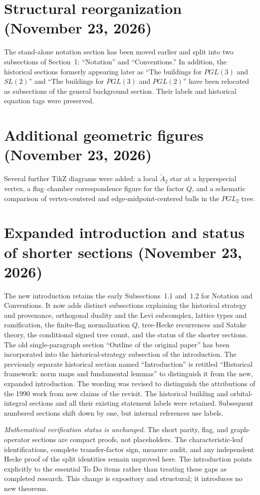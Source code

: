 \documentclass[12pt,letterpaper]{amsart}
\begin{document}
\section*{Structural reorganization (November 23, 2026)}
The stand-alone notation section has been moved earlier and split into two subsections of Section~1: ``Notation'' and ``Conventions.'' In addition, the historical sections formerly appearing later as ``The buildings for $PGL(3)$ and $SL(2)$'' and ``The buildings for $PGL(3)$ and $PGL(2)$'' have been relocated as subsections of the general background section. Their labels and historical equation tags were preserved.

\section*{Additional geometric figures (November 23, 2026)}
Several further TikZ diagrams were added: a local $\widetilde A_2$ star at a hyperspecial vertex, a flag--chamber correspondence figure for the factor $Q$, and a schematic comparison of vertex-centered and edge-midpoint-centered balls in the $PGL_2$ tree.

\section*{Expanded introduction and status of shorter sections (November 23, 2026)}
The new introduction retains the early Subsections~1.1 and~1.2 for
Notation and Conventions. It now adds distinct subsections explaining
the historical strategy and provenance, orthogonal duality and the
Levi subcomplex, lattice types and ramification, the finite-flag
normalization $Q$, tree-Hecke recurrences and Satake theory, the
conditional signed tree count, and the status of the shorter sections.
The old single-paragraph section ``Outline of the original paper''
has been incorporated into the historical-strategy subsection of
the introduction. The previously separate historical section named
``Introduction'' is retitled ``Historical framework: norm maps and fundamental lemmas''
to distinguish it from the new, expanded introduction. The wording was revised to distinguish the
attributions of the 1990 work from new claims of the revisit. The
historical building and orbital-integral sections and all their
existing statement labels were retained. Subsequent numbered
sections shift down by one, but internal references use labels.

\emph{Mathematical verification status is unchanged.}
The short parity, flag, and graph-operator sections are compact
proofs, not placeholders. The characteristic-leaf identifications,
complete transfer-factor sign, measure audit, and any independent
Hecke proof of the split identities remain unproved here. The
introduction points explicitly to the essential To Do items rather
than treating these gaps as completed research. This change is
expository and structural; it introduces no new theorems.
\end{document}
